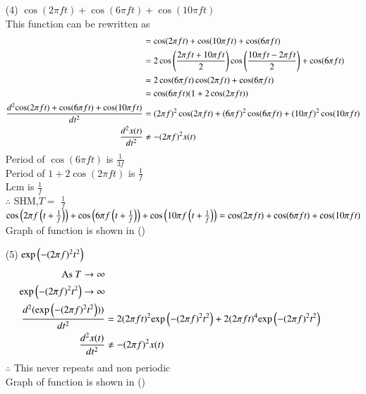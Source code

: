 \documentclass[journal,12pt,onecolumn]{IEEEtran}
\theoremstyle{remark}
\begin{document}
\begin{enumerate}
 \item[(4)]  $\cos(2\pi f t)+\cos(6\pi  f t)+\cos(10\pi  f t)$\\

This function can be rewritten as\\ 
 \begin{align}
  &=\cos(2\pi f t)+\cos(10\pi  f t)+\cos(6\pi  f t)\\
  &=2\cos\left(\frac{2\pi f t+10\pi f t}{2}\right)\cos\left(\frac{10\pi  f t-2\pi f t}{2}\right) +\cos(6\pi f t)\\
  &=2\cos(6\pi  f t) \cos(2\pi f t)+\cos(6\pi  f t)\\
  &=\cos(6\pi  f t) (1+2\cos(2\pi f t))\\
     \frac{d^2{\cos(2\pi f t)+\cos(6\pi  f t)+\cos(10\pi  f t)}}{dt^2}&=(2\pi f)^2\cos(2\pi f t)+(6\pi f)^2\cos(6\pi  f t)+(10\pi f)^2\cos(10\pi  f t)\\
      \frac{d^2 x(t)}{dt^2} &\neq - (2\pi f)^2 x(t)
 \end{align}
 Period of $\cos(6\pi  f t)$ is $\frac{1}{3f}$\\ 
 Period of $1+2\cos(2\pi f t)$ is $\frac{1}{f}$\\ 
 Lcm is $\frac{1}{f}$\\
 $\therefore$  SHM,$T=$ $\frac{1}{f}$\\
 $\cos\left(2\pi f \left(t+\frac{1}{f}\right)\right)+\cos\left(6\pi  f \left(t+\frac{1}{f}\right)\right)+\cos\left(10\pi  f \left(t+\frac{1}{f}\right)\right)=\cos(2\pi f t)+\cos(6\pi  f t)+\cos(10\pi  f t)$\\
 Graph of function is shown in ()
 \\

 \item[(5)]  $\text{exp}\left(-(2\pi f)^2 t^2\right)$\\

       \begin{align}
     \text{As } T\to\infty\\
    \text{exp}\left(-(2\pi f)^2 t^2\right)\to \infty\\ 
    \frac{d^2(\text{exp}\left(-(2\pi f)^2 t^2\right)))}{dt^2}&=2(2\pi ft)^2\text{exp}\left(-(2\pi f)^2 t^2\right)+2(2\pi ft)^4\text{exp}\left(-(2\pi f)^2 t^2\right)\\
    \frac{d^2 x(t)}{dt^2} &\neq - (2\pi f)^2 x(t)
       \end{align}
    $\therefore$  This never repeats and non periodic\\
    Graph of function is shown in ()
    \\
    

\end{enumerate}
\end{document}
